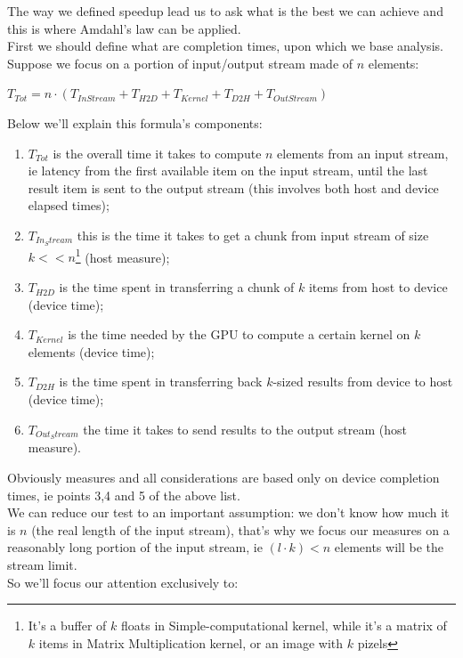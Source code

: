 The way we defined speedup lead us to ask what is the best we can achieve and this is where Amdahl's law can be applied.\\
First we should define what are completion times, upon which we base analysis. Suppose we focus on a portion of input/output stream made of \(n\) elements:
\begin{center}
	\(T_{Tot} = n \cdot (T_{In Stream} + T_{H2D} + T_{Kernel} + T_{D2H} +T_{Out Stream}) \)
\end{center}
Below we'll explain this formula's components:
\begin{enumerate}
	\item 	\(T_{Tot}\) is the overall time it takes to compute \(n\) elements from an input stream, ie latency from the first available item on the input stream, until the last result item is sent to the output stream (this involves both host and device elapsed times);
	
	\item 	\(T_{In_Stream}\) this is the time it takes to get a chunk from input stream of size \(k << n\)\footnote{It's a buffer of \(k\) floats in Simple-computational kernel, while it's a matrix of \(k\) items in Matrix Multiplication kernel, or an image with \(k\) pizels} (host measure);
	
	\item 	\(T_{H2D}\) is the time spent in transferring a chunk of \(k\) items from host to device (device time);
	
	\item \(T_{Kernel}\) is the time needed by the GPU to compute a certain kernel on \(k\) elements (device time);
	
	\item 	\(T_{D2H}\) is the time spent in transferring back \(k\)-sized results from device to host (device time);
	
	\item 	\(T_{Out_Stream}\) the time it takes to send results to the output stream (host measure).
\end{enumerate}
Obviously measures and all considerations are based only on device completion times, ie points 3,4 and 5 of the above list.\\
We can reduce our test to an important assumption: we don't know how much it is \(n\) (the real length of the input stream), that's why we focus our measures on a reasonably long portion of the input stream, ie \((l \cdot k) < n\) elements will be the stream limit.\\
So we'll focus our attention exclusively to:
